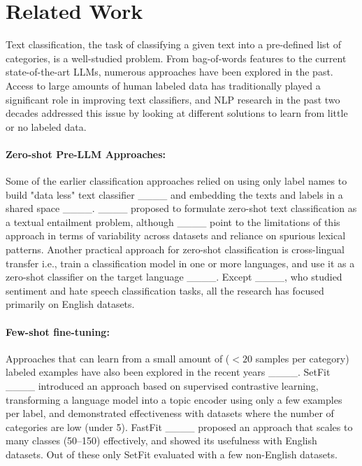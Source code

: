 \section{Related Work}
\label{sec:related}
Text classification, the task of classifying a given text into a pre-defined list of categories, is a well-studied problem. From bag-of-words features to the current state-of-the-art LLMs, numerous approaches have been explored in the past. Access to large amounts of human labeled data has traditionally played a significant role in improving text classifiers, and NLP research in the past two decades addressed this issue by looking at different solutions to learn from little or no labeled data.

\paragraph{Zero-shot Pre-LLM Approaches: }Some of the earlier classification approaches relied on using only label names to build "data less" text classifier ____ and embedding the texts and labels in a shared space ____. ____ proposed to formulate zero-shot text classification as a textual entailment problem, although ____ point to the limitations of this approach in terms of variability across datasets and reliance on spurious lexical patterns. Another practical approach for zero-shot classification is cross-lingual transfer i.e., train a classification model in one or more languages, and use it as a zero-shot classifier on the target language ____. Except ____, who studied sentiment and hate speech classification tasks, all the research has  focused primarily on English datasets. 

\paragraph{Few-shot fine-tuning: } Approaches that can learn from a small amount of ($<20$ samples per category) labeled examples have also been explored in the recent years ____. SetFit ____ introduced an approach based on supervised contrastive learning, transforming a language model into a topic encoder using only a few examples per label, and demonstrated effectiveness with datasets where the number of categories are low (under 5). FastFit ____ proposed an approach that scales to many classes (50--150) effectively, and showed its usefulness with English datasets. Out of these only SetFit evaluated with a few non-English datasets. %

